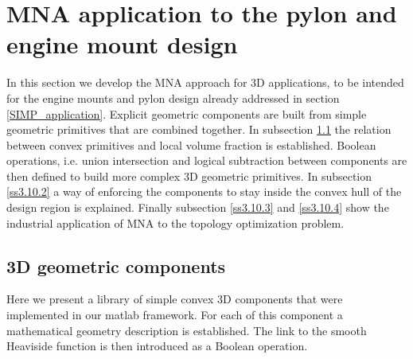  \section{MNA application to the pylon and engine mount design}
 \label{MNA_application}
 In this section we develop the MNA approach for 3D applications, to be intended for the engine mounts and pylon design already addressed in section \ref{SIMP_application}. Explicit geometric components are built from simple geometric primitives that are combined together. In subsection \ref{ss3.10.1} the relation between convex primitives and local volume fraction is established. Boolean operations, i.e. union intersection and logical subtraction between components are then defined to build more complex 3D geometric primitives. In subsection \ref{ss3.10.2} a way of enforcing the components to stay inside the convex hull of the design region is explained. Finally subsection  \ref{ss3.10.3} and \ref{ss3.10.4} show the industrial application of MNA to the topology optimization problem. 
 \subsection{3D geometric components}
 \label{ss3.10.1}
 Here we present a library of simple convex 3D components that were implemented in our matlab framework.
 For each of this component a mathematical geometry description is established. The link to the smooth Heaviside function is then introduced as a Boolean operation.
